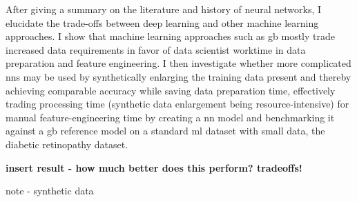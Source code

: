 
After giving a summary on the literature and history of neural networks, I elucidate the trade-offs between deep learning and other machine learning approaches. I show that machine learning approaches such as \ac{gb} mostly trade increased data requirements in favor of data scientist worktime in data preparation and feature engineering.
I then investigate whether more complicated \acp{nn} may be used by synthetically enlarging the training data present and thereby achieving comparable accuracy while saving data preparation time, effectively trading processing time (synthetic data enlargement being resource-intensive) for manual feature-engineering time by creating a \ac{nn} model and benchmarking it against a \ac{gb} reference model on a standard \ac{ml} dataset with small data, the diabetic retinopathy dataset.

\textbf{insert result - how much better does this perform? tradeoffs!}

note - synthetic data \cite{ares_utility}

